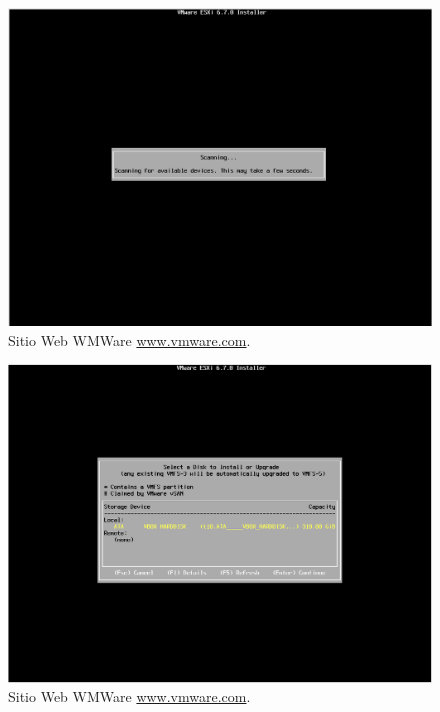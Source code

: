 \begin{figure}[!hbtp]
	\centering
	\includegraphics[width=\linewidth]{Trabajo/RecursosEducativos/RE01_VMwareESXi/RE_VMwareInstalacion07.png}
	\vspace{-0.2cm}
	\caption{Sitio Web WMWare \url{www.vmware.com}.\footnotemark[2]{} }
	\label{fig:VMwareInstalacion07}
\end{figure}


\begin{figure}[!hbtp]
	\centering
	\includegraphics[width=\linewidth]{Trabajo/RecursosEducativos/RE01_VMwareESXi/RE_VMwareInstalacion08.png}
	\vspace{-0.2cm}
	\caption{Sitio Web WMWare \url{www.vmware.com}.\footnotemark[2]{} }
	\label{fig:VMwareInstalacion08}
\end{figure}


